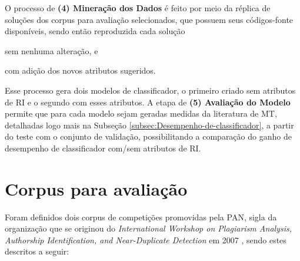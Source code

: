    O processo de \textbf{(4) Mineração dos Dados} é feito por meio da réplica de soluções dos corpus para avaliação selecionados, que possuem seus códigos-fonte disponíveis, sendo então reproduzida cada solução 
    \begin{enumerate*}[label=(\alph*)]
        \item sem nenhuma alteração, e 
        \item com adição dos novos atributos sugeridos.
    \end{enumerate*}
    Esse processo gera dois modelos de classificador, o primeiro criado sem atributos de RI e o segundo com esses atributos.
    A etapa de \textbf{(5) Avaliação do Modelo} permite que para cada modelo sejam geradas medidas da literatura de MT, detalhadas logo mais na Subseção \ref{subsec:Desempenho-de-classificador}, a partir do teste com o conjunto de validação, possibilitando a comparação do ganho de desempenho de classificador com/sem atributos de RI.
    
    
    

\section{Corpus para avaliação}  \label{sec:Corpus-para-avaliação}
    Foram definidos dois corpus de competições promovidas pela PAN, sigla da organização que se originou do \textit{International Workshop on Plagiarism Analysis, Authorship Identification, and Near-Duplicate Detection} em 2007 \cite{PAN_Workshop_2007}, sendo estes descritos a seguir:%
    
